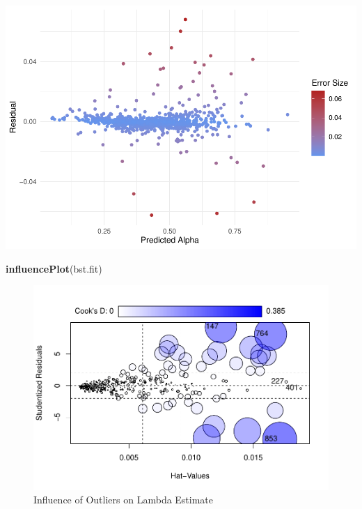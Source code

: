\documentclass[10pt]{article}
\newenvironment{Shaded}{\begin{snugshade}}{\end{snugshade}}
\newcommand{\FunctionTok}[1]{\textcolor[rgb]{0.13,0.29,0.53}{\textbf{#1}}}
\newcommand{\NormalTok}[1]{#1}
\begin{document}
\includegraphics{CodeAppendix_files/figure-latex/residz-1.pdf}

\begin{Shaded}
\begin{Highlighting}[]
\FunctionTok{influencePlot}\NormalTok{(bst.fit)}
\end{Highlighting}
\end{Shaded}

\begin{figure}
\centering
\includegraphics{CodeAppendix_files/figure-latex/infl-1.pdf}
\caption{\label{fig:infl}Influence of Outliers on Lambda Estimate}
\end{figure}

\singlespacing
\newpage
{}
\end{document}
